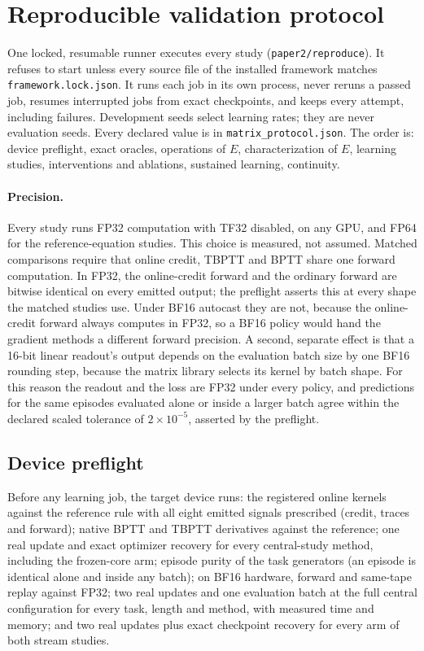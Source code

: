 \documentclass[11pt]{article}
\theoremstyle{definition}
\begin{document}
\section{Reproducible validation protocol}
\label{sec:validation}

One locked, resumable runner executes every study (\texttt{paper2/reproduce}). It
refuses to start unless every source file of the installed framework matches
\texttt{framework.lock.json}. It runs each job in its own process, never reruns a
passed job, resumes interrupted jobs from exact checkpoints, and keeps every
attempt, including failures. Development seeds select learning rates; they are
never evaluation seeds. Every declared value is in \texttt{matrix\_protocol.json}.
The order is: device preflight, exact oracles, operations of $E$, characterization
of $E$, learning studies, interventions and ablations, sustained learning,
continuity.

\paragraph{Precision.} Every study runs FP32 computation with TF32 disabled, on any
GPU, and FP64 for the reference-equation studies. This choice is measured, not
assumed. Matched comparisons require that online credit, TBPTT and BPTT share one
forward computation. In FP32, the online-credit forward and the ordinary forward
are bitwise identical on every emitted output; the preflight asserts this at every
shape the matched studies use. Under BF16 autocast they are not, because the
online-credit forward always computes in FP32, so a BF16 policy would hand the
gradient methods a different forward precision. A second, separate effect is that a
16-bit linear readout's output depends on the evaluation batch size by one BF16
rounding step, because the matrix library selects its kernel by batch shape. For
this reason the readout and the loss are FP32 under every policy, and predictions
for the same episodes evaluated alone or inside a larger batch agree within the
declared scaled tolerance of $2\times10^{-5}$, asserted by the preflight.

\subsection{Device preflight}

Before any learning job, the target device runs: the registered online kernels
against the reference rule with all eight emitted signals prescribed (credit,
traces and forward); native BPTT and TBPTT derivatives against the reference; one
real update and exact optimizer recovery for every central-study method, including
the frozen-core arm; episode purity of the task generators (an episode is identical
alone and inside any batch); on BF16
hardware, forward and same-tape replay against FP32; two real updates and one
evaluation batch at the full central configuration for every task, length and
method, with measured time and memory; and two real updates plus exact checkpoint
recovery for every arm of both stream studies.
\end{document}
